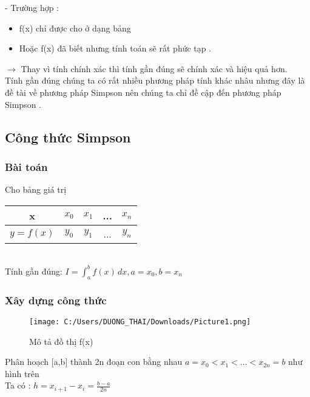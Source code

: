 \documentclass[14pt,a4paper]{article}
\begin{document}
\fontsize{13pt}{2pt}\selectfont - Trường hợp : \\
\begin{itemize}
\item  \fontsize{13pt}{2pt}\selectfont 	f(x) chỉ được cho ở dạng bảng  \\
\item \fontsize{13pt}{2pt}\selectfont 	Hoặc f(x) đã biết nhưng tính toán sẽ rất phức tạp .\\
\end{itemize}
 $\to$	Thay vì tính chính xác thì tính gần đúng sẽ chính xác và hiệu quả hơn.\\
\hspace*{1cm} Tính gần đúng chúng ta có rất nhiều phương pháp  tính khác nhâu nhưng đây là đề tài về phương pháp Simpson nên chúng ta chỉ đề cập đến phương pháp Simpson .\\
\subsection{ Công thức Simpson}
\subsubsection* {Bài toán}
 \vspace{6pt }Cho bảng giá trị
\begin{tabular}{c|c|c|c|c}
	
	x &  ${\displaystyle x_0}$ &  ${\displaystyle x_1}$ & ... &  ${\displaystyle x_n}$ \\
	\hline
	${\displaystyle y=f(x)}$ &  ${\displaystyle y_0}$ &  ${\displaystyle y_1}$ & ... &  ${\displaystyle y_n}$ \\
	
\end{tabular} \\ 
\hspace*{30pt} Tính gần đúng: ${\displaystyle I=\int_{a}^{b}f(x)\,dx ,a=x_0 ,b=x_n}$ \\
\subsubsection*{Xây dựng công thức }
\begin{figure}[H]
	\centering
	\texttt{[image: C:/Users/DUONG\_THAI/Downloads/Picture1.png]}
	\caption[Mô tả đồ thị f(x)]{Mô tả đồ thị f(x)}
	\label{hinh21}
\end{figure}
 	   Phân hoạch [a,b] thành 2n đoạn con bằng nhau ${\displaystyle a=x_0<x_1<…<x_{2n}=b}$ như hình trên\\
 	   \vspace{6pt}
 	   \hspace*{30pt}Ta có : ${\displaystyle h= x_{i+1} - x_i = \frac{b-a}{2n}}$\\ 
 	   
\end{document}
